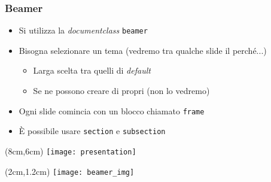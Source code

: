 \begin{frame}
  
  \frametitle{Beamer}
  
  \begin{itemize}
   \item Si utilizza la \textit{documentclass} \texttt{beamer}
   \item Bisogna selezionare un tema (vedremo tra qualche slide il perché...)
   \begin{itemize}
    \item Larga scelta tra quelli di \textit{default}
    \item Se ne possono creare di propri (non lo vedremo)
   \end{itemize}
   \item Ogni slide comincia con un blocco chiamato \texttt{frame}
   \item È possibile usare \texttt{section} e \texttt{subsection}
  \end{itemize}
  
  \begin{textblock*}{5cm}(8cm,6cm)
    \texttt{[image: presentation]}
  \end{textblock*}
 
  \begin{textblock*}{5cm}(2cm,1.2cm)
    \texttt{[image: beamer\_img]}
  \end{textblock*}

\end{frame}
